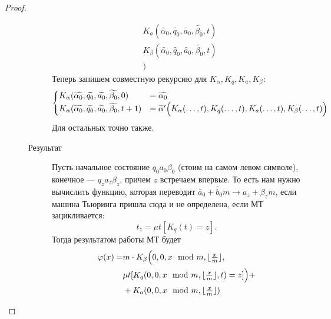 \begin{proof}
\begin{description}
\begin{description}
\[\begin{aligned}
			 &K_{ a }(\widetilde{ \alpha_0} , \widetilde{ q_0} , \widetilde{ a_0}, \widetilde{ \beta_0}, t) \\ 
			 &K_{ \beta  }(\widetilde{ \alpha_0} , \widetilde{ q_0} , \widetilde{ a_0}, \widetilde{ \beta_0}, t) \\ 
			 &)
	\end{aligned}
	\]
	Теперь запишем совместную рекурсию для $ K_{ \alpha }, K_{ q}, K_{a}, K_{ \beta }$:
	\[
	\begin{aligned}
		\begin{cases}
			K_{ \alpha }(\widetilde{ \alpha _0} , \widetilde{ q_0} , \widetilde{ a_0} , \widetilde{ \beta _0} , 0) &= \widetilde{ \alpha _0} \\
			K_{ \alpha }(\widetilde{ \alpha _0} , \widetilde{ q_0} , \widetilde{ a_0} , \widetilde{ \beta _0} , t+1) &= \widetilde{ \alpha } ' \Bigl(  
				K_{ \alpha }( \ldots , t), K_{q} (\ldots , t), K_{a} (\ldots , t) , K_{ \beta }(\ldots , t)
			\Bigr)
		\end{cases}
	\end{aligned}
	\]
	Для остальных точно также.

\item[Результат] 
	Пусть начальное состояние $ q_0 a_0 \beta_0$ (стоим на самом левом символе), конечное  --- $ q_{z} a_{z} \beta _{z}$, причем $ z$ встречаем впервые. 
	То есть нам нужно вычислить функцию, которая переводит $ \widetilde{ a_0} + \widetilde{ b_0} m \longrightarrow a_z + \beta _z m$, если машина Тьюринга пришла сюда и не определена, если МТ зацикливается:
	\[
		t_z = \mu t[K_{q}(t) = z]
	.\] 
	Тогда результатом работы МТ будет
	\[
	\begin{aligned}
		\varphi (x) =& m \cdot  K _{\beta} \Bigl(0, 0, x \mod m, \lfloor \tfrac{x}{m} \rfloor , \\
					 &\mu t[K_{q}(0, 0, x \mod m, \lfloor \tfrac{x}{m} \rfloor, t) = z]\Bigr) +\\ 
				   &+ K_{a}(0, 0, x \mod m, \lfloor \tfrac{x}{m} \rfloor)
	\end{aligned}
	\]
			\end{description}
    \end{description} 
\end{proof}

